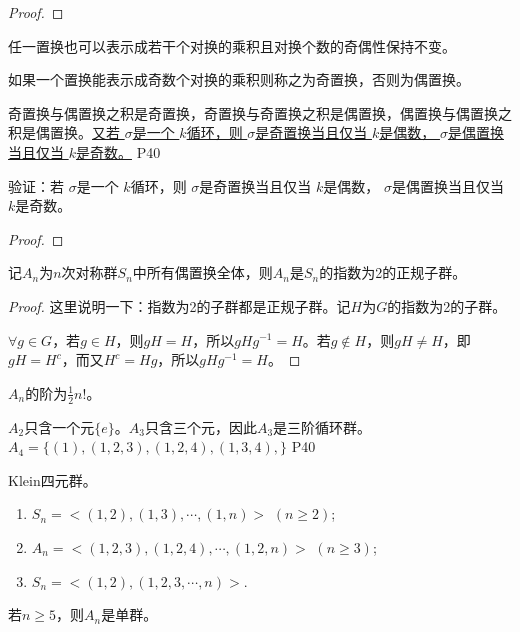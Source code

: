 \begin{proof}
	
\end{proof}

\begin{corollary}
	任一置换也可以表示成若干个对换的乘积且对换个数的奇偶性保持不变。
\end{corollary}

\begin{definition}
	如果一个置换能表示成奇数个对换的乘积则称之为奇置换，否则为偶置换。
\end{definition}

\original
{
	奇置换与偶置换之积是奇置换，奇置换与奇置换之积是偶置换，偶置换与偶置换之积是偶置换。\uline{又若 $\sigma$是一个 $k$循环，则 $\sigma$是奇置换当且仅当 $k$是偶数， $\sigma$是偶置换当且仅当 $k$是奇数。}
}
{P40}

\begin{proposition}
	验证：若 $\sigma$是一个 $k$循环，则 $\sigma$是奇置换当且仅当 $k$是偶数， $\sigma$是偶置换当且仅当 $k$是奇数。
\end{proposition}

\begin{proof}
	
\end{proof}

\begin{proposition}
	记$A_{n}$为$n$次对称群$S_{n}$中所有偶置换全体，则$A_{n}$是$S_{n}$的指数为2的正规子群。
\end{proposition}

\begin{proof}
	这里说明一下：指数为2的子群都是正规子群。记$H$为$G$的指数为2的子群。
	\par
	$\forall g\in G$，若$g\in H$，则$gH=H$，所以$gHg^{-1}=H$。若$g\not\in H$，则$gH\neq H$，即$gH=H^{c}$，而又$H^{c}=Hg$，所以$gHg^{-1}=H $。
\end{proof}

\begin{corollary}
	$A_{n}$的阶为$\frac{1}{2}n!$。
\end{corollary}


\original
{
	$A_{2}$只含一个元$\{e\}$。$A_{3}$只含三个元，因此$A_{3}$是三阶循环群。$A_{4}=\{(1),(1,2,3),(1,2,4),(1,3,4),\}$
}
{P40}

\begin{example}
	Klein四元群。
\end{example}

\begin{proposition}
	\begin{enumerate}
		\item $S_{n}=<(1,2),(1,3),\cdots,(1,n)>\,\,(n\geq 2)$;
		\item $A_{n}=<(1,2,3),(1,2,4),\cdots,(1,2,n)>\,\,(n\geq 3)$;
		\item $S_{n}=<(1,2),(1,2,3,\cdots,n)>$.
	\end{enumerate}
\end{proposition}

\begin{theorem}
	若$n\geq 5$，则$A_{n}$是单群。
\end{theorem}